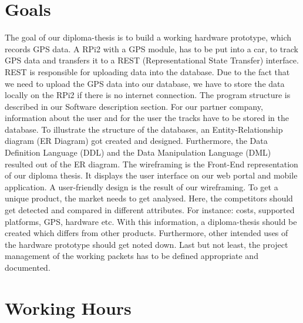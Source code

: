 \section*{Goals}
The goal of our diploma-thesis is to build a working hardware prototype, which records GPS data. A RPi2 with a GPS module, has to be put into a car, to track GPS data and transfers it to a REST (Representational State Transfer) interface. REST is responsible for uploading data into the database. Due to the fact that we need to upload the GPS data into our database, we have to store the data locally on the RPi2 if there is no internet connection. The program structure is described in our Software description section.
\newline \newline
For our partner company, information about the user and for the user the tracks have to be stored in the database. To illustrate the structure of the databases, an Entity-Relationship diagram (ER Diagram) got created and designed. Furthermore, the Data Definition Language (DDL) and the Data Manipulation Language (DML) resulted out of the ER diagram.
\newline \newline
The wireframing is the Front-End representation of our diploma thesis. It displays the user interface on our web portal and mobile application. A user-friendly design is the result of our wireframing.
\newline \newline
To get a unique product, the market needs to get analysed. Here, the competitors should get detected and compared in different attributes. For instance: costs, supported platforms, GPS, hardware etc. With this information, a diploma-thesis should be created which differs from other products. Furthermore, other intended uses of the hardware prototype should get noted down.
\newline \newline
Last but not least, the project management of the working packets has to be defined appropriate and documented.
\section*{Working Hours}
